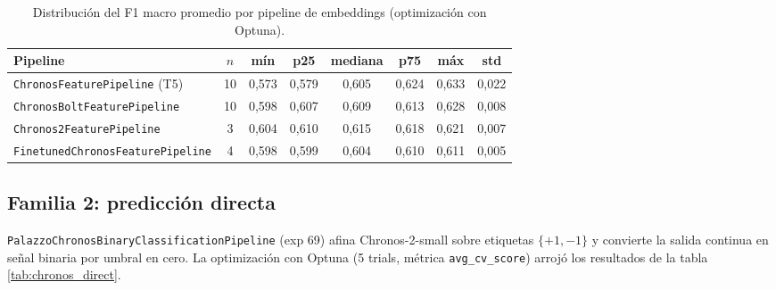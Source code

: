 \begin{table}[H]
    \centering
    \caption[Distribución F1 Chronos embeddings]{Distribución del F1 macro promedio por pipeline de embeddings (optimización con Optuna).}
    \small
    \begin{adjustbox}{max width=\textwidth}
    \begin{tabular}{l c c c c c c c}
        \toprule
        \textbf{Pipeline} & \textbf{$n$} & \textbf{mín} & \textbf{p25} & \textbf{mediana} & \textbf{p75} & \textbf{máx} & \textbf{std} \\
        \midrule
        \texttt{ChronosFeaturePipeline} (T5)     & 10 & 0,573 & 0,579 & 0,605 & 0,624 & 0,633 & 0,022 \\
        \texttt{ChronosBoltFeaturePipeline}       & 10 & 0,598 & 0,607 & 0,609 & 0,613 & 0,628 & 0,008 \\
        \texttt{Chronos2FeaturePipeline}          &  3 & 0,604 & 0,610 & 0,615 & 0,618 & 0,621 & 0,007 \\
        \texttt{FinetunedChronosFeaturePipeline}  &  4 & 0,598 & 0,599 & 0,604 & 0,610 & 0,611 & 0,005 \\
        \bottomrule
    \end{tabular}
    \end{adjustbox}
    \label{tab:chronos_f1_dist}
\end{table}

\subsection{Familia 2: predicción directa}

\texttt{PalazzoChronosBinaryClassificationPipeline} (exp 69) afina Chronos-2-small sobre etiquetas $\{+1, -1\}$ y convierte la salida continua en señal binaria por umbral en cero. La optimización con Optuna (5 trials, métrica \texttt{avg\_cv\_score}) arrojó los resultados de la tabla \ref{tab:chronos_direct}.

